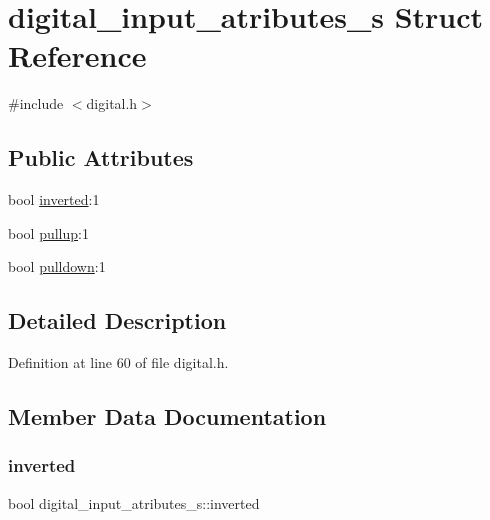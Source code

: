\hypertarget{structdigital__input__atributes__s}{}\section{digital\+\_\+input\+\_\+atributes\+\_\+s Struct Reference}
\label{structdigital__input__atributes__s}


{\ttfamily \#include $<$digital.\+h$>$}

\subsection*{Public Attributes}
\begin{DoxyCompactItemize}
\item 
bool \hyperlink{structdigital__input__atributes__s_a70f39128b1e791afd5153f64de48d624}{inverted}\+:1
\item 
bool \hyperlink{structdigital__input__atributes__s_a6ec80ac384d462fe6869744f4015158f}{pullup}\+:1
\item 
bool \hyperlink{structdigital__input__atributes__s_aaf0e965572aaf3526c3e0375600b8751}{pulldown}\+:1
\end{DoxyCompactItemize}


\subsection{Detailed Description}


Definition at line 60 of file digital.\+h.



\subsection{Member Data Documentation}
\mbox{\label{structdigital__input__atributes__s_a70f39128b1e791afd5153f64de48d624}} 
\subsubsection{\texorpdfstring{inverted}{inverted}}
{\footnotesize\ttfamily bool digital\+\_\+input\+\_\+atributes\+\_\+s\+::inverted}



